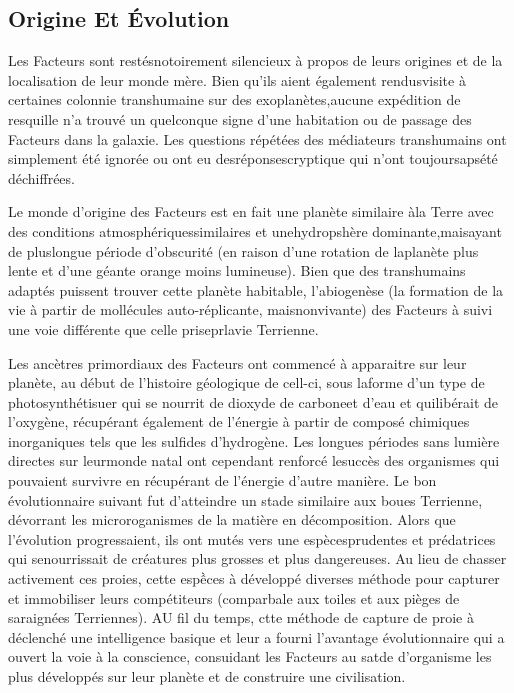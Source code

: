 \subsection{Origine Et Évolution} 

Les Facteurs sont restésnotoirement silencieux à propos de leurs origines et de la localisation de leur monde mère. Bien qu'ils aient également rendusvisite à certaines colonnie transhumaine sur des exoplanètes,aucune expédition de resquille n'a trouvé un quelconque signe d'une habitation ou de passage des Facteurs dans la galaxie. Les questions répétées des médiateurs transhumains ont simplement été ignorée ou ont eu desréponsescryptique qui n'ont toujoursapsété déchiffrées. 

Le monde d'origine des Facteurs est en fait une planète similaire àla Terre avec des conditions atmosphériquessimilaires et unehydropshère dominante,maisayant de pluslongue période d'obscurité (en raison d'une rotation de laplanète plus lente et d'une géante orange moins lumineuse). Bien que des transhumains adaptés puissent trouver cette planète habitable, l'abiogenèse (la formation de la vie à partir de mollécules auto-réplicante, maisnonvivante) des Facteurs à suivi une voie différente que celle priseprlavie Terrienne. 

Les ancètres primordiaux des Facteurs ont commencé à apparaitre sur leur planète, au début de l'histoire géologique de cell-ci, sous laforme d'un type de photosynthétisuer qui se nourrit de dioxyde de carboneet d'eau et quilibérait de l'oxygène, récupérant également de l'énergie à partir de composé chimiques inorganiques tels que les sulfides d'hydrogène. Les longues périodes sans lumière directes sur leurmonde natal ont cependant renforcé lesuccès des organismes qui pouvaient survivre en récupérant de l'énergie d'autre manière. Le bon évolutionnaire suivant fut d'atteindre un stade similaire aux boues Terrienne, dévorrant les microroganismes de la matière en décomposition. Alors que l'évolution progressaient, ils ont mutés vers une espècesprudentes et prédatrices qui senourrissait de créatures plus grosses et plus dangereuses. Au lieu de chasser activement ces proies, cette espềces à développé diverses méthode pour capturer et immobiliser leurs compétiteurs (comparbale aux toiles et aux pièges de saraignées Terriennes). AU fil du temps, ctte méthode de capture de proie à déclenché une intelligence basique et leur a fourni l'avantage évolutionnaire qui a ouvert la voie à la conscience, consuidant les Facteurs au satde d'organisme les plus développés sur leur planète et de construire une civilisation. 



